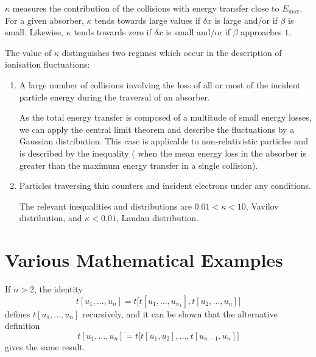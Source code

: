$\kappa$ measures the contribution of the collisions with energy
transfer close to $E_{\textrm{max}}$.  For a given absorber, $\kappa$
tends
towards large values if $\delta x$ is large and/or if $\beta$ is
small.  Likewise, $\kappa$ tends towards zero if $\delta x $ is small
and/or if $\beta$ approaches $1$.

The value of $\kappa$ distinguishes two regimes which occur in the
description of ionisation fluctuations:

\begin{enumerate}
\item A large number of collisions involving the loss of all or most
    of the incident particle energy during the traversal of an absorber.

    As the total energy transfer is composed of a multitude of small
    energy losses, we can apply the central limit theorem and describe
    the fluctuations by a Gaussian distribution.  This case is
    applicable to non-relativistic particles and is described by the
    inequality ( when the mean energy loss in the
    absorber is greater than the maximum energy transfer in a single
    collision).

\item Particles traversing thin counters and incident electrons under
    any conditions.

    The relevant inequalities and distributions are $ 0.01 < \kappa < 10
    $,
    Vavilov distribution, and $\kappa < 0.01 $, Landau distribution.
\end{enumerate}


\section{Various Mathematical Examples}
If $n > 2$, the identity
\[
    t[u_1,\dots,u_n] = t\bigl[t[u_1,\dots,u_{n_1}], t[u_2,\dots,u_n]
    \bigr]
\]
defines $t[u_1,\dots,u_n]$ recursively, and it can be shown that the
alternative definition
\[
    t[u_1,\dots,u_n] = t\bigl[t[u_1,u_2],\dots,t[u_{n-1},u_n]\bigr]
\]
gives the same result.

